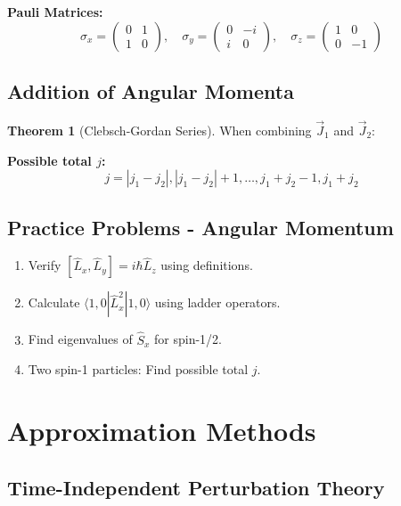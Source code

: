 \documentclass[12pt,a4paper]{article}
\theoremstyle{definition}
\newtheorem{theorem}{Theorem}[section]
\begin{document}
\begin{importantbox}
\textbf{Pauli Matrices:}
\[
\sigma_x = \begin{pmatrix} 0 & 1 \\ 1 & 0 \end{pmatrix}, \quad
\sigma_y = \begin{pmatrix} 0 & -i \\ i & 0 \end{pmatrix}, \quad
\sigma_z = \begin{pmatrix} 1 & 0 \\ 0 & -1 \end{pmatrix}
\]
\end{importantbox}

\subsection{Addition of Angular Momenta}

\begin{theorem}[Clebsch-Gordan Series]
When combining $\vec{J}_1$ and $\vec{J}_2$:

\textbf{Possible total $j$:}
\[
j = |j_1 - j_2|, |j_1 - j_2| + 1, \ldots, j_1 + j_2 - 1, j_1 + j_2
\]
\end{theorem}

\subsection{Practice Problems - Angular Momentum}

\begin{enumerate}
    \item Verify $[\hat{L}_x, \hat{L}_y] = i\hbar\hat{L}_z$ using definitions.
    \item Calculate $\langle 1,0|\hat{L}_x^2|1,0\rangle$ using ladder operators.
    \item Find eigenvalues of $\hat{S}_x$ for spin-1/2.
    \item Two spin-1 particles: Find possible total $j$.
\end{enumerate}

\newpage
\section{Approximation Methods}

\subsection{Time-Independent Perturbation Theory}
\end{document}
